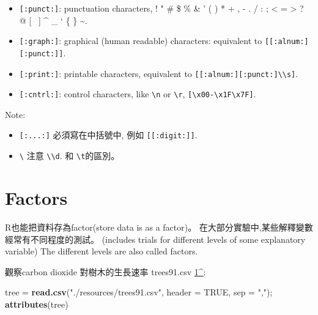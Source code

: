 \documentclass[]{book}
\newenvironment{Shaded}{\begin{snugshade}}{\end{snugshade}}
\newcommand{\DataTypeTok}[1]{\textcolor[rgb]{0.13,0.29,0.53}{#1}}
\newcommand{\KeywordTok}[1]{\textcolor[rgb]{0.13,0.29,0.53}{\textbf{#1}}}
\newcommand{\NormalTok}[1]{#1}
\newcommand{\OtherTok}[1]{\textcolor[rgb]{0.56,0.35,0.01}{#1}}
\newcommand{\StringTok}[1]{\textcolor[rgb]{0.31,0.60,0.02}{#1}}
\providecommand{\tightlist}{%
  \setlength{\itemsep}{0pt}\setlength{\parskip}{0pt}}
\theoremstyle{definition}
\theoremstyle{definition}
\theoremstyle{definition}
\theoremstyle{remark}
\begin{document}
\begin{itemize}
\item
  \texttt{{[}:punct:{]}}: punctuation characters, ! " \# \$ \% \& ' ( )
  * + , - . / : ; \textless{} = \textgreater{} ? @ {[} ~{]} \^{} \_ ` \{
  \textbar{} \} \textasciitilde{}.
\item
  \texttt{{[}:graph:{]}}: graphical (human readable) characters:
  equivalent to \texttt{{[}{[}:alnum:{]}{[}:punct:{]}{]}}.
\item
  \texttt{{[}:print:{]}}: printable characters, equivalent to
  \texttt{{[}{[}:alnum:{]}{[}:punct:{]}\textbackslash{}\textbackslash{}s{]}}.
\item
  \texttt{{[}:cntrl:{]}}: control characters, like
  \texttt{\textbackslash{}n} or \texttt{\textbackslash{}r},
  \texttt{{[}\textbackslash{}x00-\textbackslash{}x1F\textbackslash{}x7F{]}}.
\end{itemize}

Note:

\begin{itemize}
\tightlist
\item
  \texttt{{[}:...:{]}} 必須寫在中括號中, 例如
  \texttt{{[}{[}:digit:{]}{]}}.\\
\item
  \texttt{\textbackslash{}} 注意
  \texttt{\textbackslash{}\textbackslash{}d}. 和
  \texttt{\textbackslash{}t}的區別。
\end{itemize}

\hypertarget{factors}{%
\section{Factors}\label{factors}}

R也能把資料存為factor(store data is as a factor)。
在大部分實驗中,某些解釋變數經常有不同程度的測試。 (includes trials for
different levels of some explanatory variable) The different levels are
also called factors.

觀察carbon dioxide 對樹木的生長速率 trees91.csv
\href{The\%20original\%20spreadsheet\%20is\%20located\%20at\%20http://cdiac.ornl.gov/ftp/ndp061a/trees91.wk1.}{1\^{}}:

\begin{Shaded}
\begin{Highlighting}[]
\NormalTok{tree =}\StringTok{ }\KeywordTok{read.csv}\NormalTok{(}\StringTok{"./resources/trees91.csv"}\NormalTok{, }\DataTypeTok{header =} \OtherTok{TRUE}\NormalTok{, }\DataTypeTok{sep =} \StringTok{","}\NormalTok{);}
\KeywordTok{attributes}\NormalTok{(tree)}
\end{Highlighting}
\end{Shaded}
\end{document}
